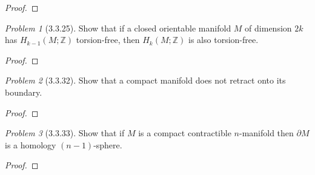 \documentclass[10pt]{article}
\newcommand{\sk}{\vskip 10mm}
\newcommand{\bb}[1]{\mathbb{#1}}
\theoremstyle{remark}
\newtheorem{problem}{Problem}
\begin{document}
\begin{proof}
  
\end{proof}

\sk

\begin{problem}[3.3.25]
  Show that if a closed orientable manifold $M$ of dimension $2k$ has
  $H_{k-1}(M;\bb{Z})$ torsion-free, then $H_k(M;\bb{Z})$ is also torsion-free.
\end{problem}

\begin{proof}
  
\end{proof}

\sk

\begin{problem}[3.3.32]
  Show that a compact manifold does not retract onto its boundary.
\end{problem}

\begin{proof}
  
\end{proof}

\sk

\begin{problem}[3.3.33]
  Show that if $M$ is a compact contractible $n$-manifold then $\partial M$ is a
  homology $(n-1)$-sphere.
\end{problem}

\begin{proof}
  
\end{proof}

\sk
\end{document}
